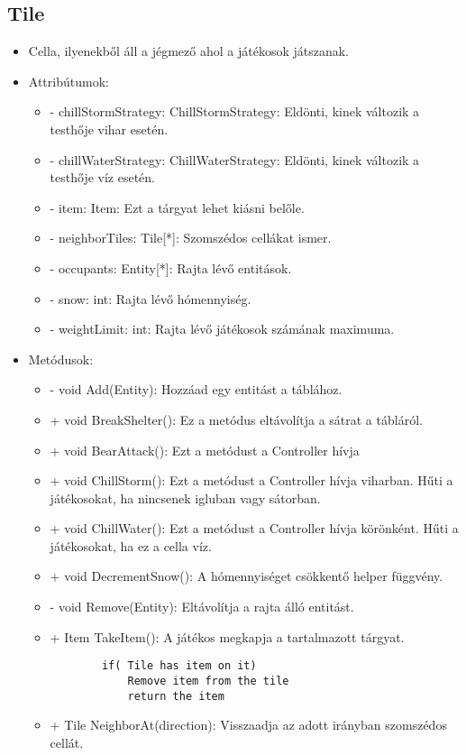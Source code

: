 \subsection{Tile}
\begin{itemize}
	\item Cella, ilyenekből áll a jégmező ahol a játékosok játszanak.
	\item Attribútumok:
	\begin{itemize}
		\item - chillStormStrategy: ChillStormStrategy: Eldönti, kinek változik a testhője vihar esetén.
		\item - chillWaterStrategy: ChillWaterStrategy: Eldönti, kinek változik a testhője víz esetén.
		\item - item: Item: Ezt a tárgyat lehet kiásni belőle.
		\item - neighborTiles: Tile[*]: Szomszédos cellákat ismer.
		\item - occupants: Entity[*]: Rajta lévő entitások.
		\item - snow: int: Rajta lévő hómennyiség.
		\item - weightLimit: int: Rajta lévő játékosok számának maximuma.		
	\end{itemize}
	\item Metódusok:
	\begin{itemize}
		\item - void Add(Entity): Hozzáad egy entitást a táblához.
		\item + void BreakShelter(): Ez a metódus eltávolítja a sátrat a tábláról.
		\item + void BearAttack(): Ezt a metódust a Controller hívja 
		\item + void ChillStorm(): Ezt a metódust a Controller hívja viharban. Hűti a játékosokat, ha nincsenek igluban vagy sátorban.
		\item + void ChillWater(): Ezt a metódust a Controller hívja körönként. Hűti a játékosokat, ha ez a cella víz.
		\item + void DecrementSnow(): A hómennyiséget csökkentő helper függvény.
		\item - void Remove(Entity): Eltávolítja a rajta álló entitást.
		\item + Item TakeItem(): A játékos megkapja a tartalmazott tárgyat.
		\begin{lstlisting}
		if( Tile has item on it)
			Remove item from the tile
			return the item
		\end{lstlisting}
		\item + Tile NeighborAt(direction): Visszaadja az adott irányban szomszédos cellát.

\end{itemize}
\end{itemize}
